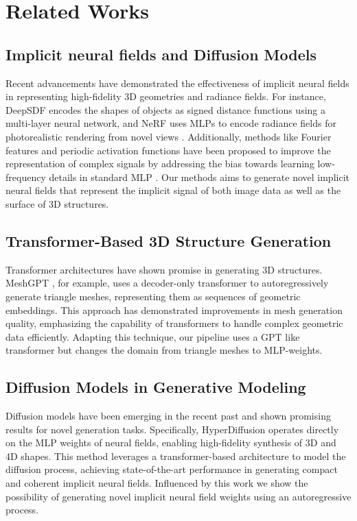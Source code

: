 \section{Related Works}
\label{sec:literature}

\subsection*{Implicit neural fields and Diffusion Models}
Recent advancements have demonstrated the effectiveness of implicit neural fields in representing high-fidelity 3D geometries and radiance fields. For instance, DeepSDF \cite{park2019deepsdflearningcontinuoussigned} encodes the shapes of objects as signed distance functions using a multi-layer neural network, and NeRF uses MLPs to encode radiance fields for photorealistic rendering from novel views \cite{mildenhall2020nerfrepresentingscenesneural}. Additionally, methods like Fourier features and periodic activation functions have been proposed to improve the representation of complex signals by addressing the bias towards learning low-frequency details in standard MLP \cite{tancik2020fourierfeaturesletnetworks, sitzmann2020implicitneuralrepresentationsperiodic}. Our methods aims to generate novel implicit neural fields that represent the implicit signal of both image data as well as the surface of 3D structures.


\subsection*{Transformer-Based 3D Structure Generation}
Transformer architectures have shown promise in generating 3D structures. MeshGPT \cite{siddiqui2023meshgpt}, for example, uses a decoder-only transformer to autoregressively generate triangle meshes, representing them as sequences of geometric embeddings. This approach has demonstrated improvements in mesh generation quality, emphasizing the capability of transformers to handle complex geometric data efficiently. Adapting this technique, our pipeline uses a GPT like transformer but changes the domain from triangle meshes to MLP-weights.


\subsection*{Diffusion Models in Generative Modeling}
Diffusion models have been emerging in the recent past and shown promising results for novel generation tasks. Specifically, HyperDiffusion \cite{erkoç2023hyperdiffusion} operates directly on the MLP weights of neural fields, enabling high-fidelity synthesis of 3D and 4D shapes. This method leverages a transformer-based architecture to model the diffusion process, achieving state-of-the-art performance in generating compact and coherent implicit neural fields. Influenced by this work we show the possibility of generating novel implicit neural field weights using an autoregressive process.
